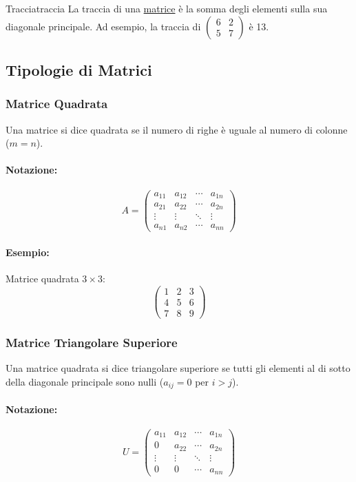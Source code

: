 \documentclass{article}
\begin{document}
\begin{definition}{Traccia}{traccia}
    La traccia di una \hyperlink{def:matrice}{matrice} è la somma degli elementi sulla sua diagonale principale. Ad esempio, la traccia di $\begin{pmatrix} 6 & 2 \\ 5 & 7 \end{pmatrix}$ è 13.
\end{definition}

\subsection{Tipologie di Matrici}

\subsubsection*{Matrice Quadrata}
Una matrice si dice quadrata se il numero di righe è uguale al numero di colonne ($m=n$).
\paragraph{Notazione:}
\[ A = \begin{pmatrix}
a_{11} & a_{12} & \cdots & a_{1n} \\
a_{21} & a_{22} & \cdots & a_{2n} \\
\vdots & \vdots & \ddots & \vdots \\
a_{n1} & a_{n2} & \cdots & a_{nn}
\end{pmatrix} \]
\paragraph{Esempio:} Matrice quadrata $3 \times 3$:
\[ \begin{pmatrix}
1 & 2 & 3 \\
4 & 5 & 6 \\
7 & 8 & 9
\end{pmatrix} \]

\subsubsection*{Matrice Triangolare Superiore}
Una matrice quadrata si dice triangolare superiore se tutti gli elementi al di sotto della diagonale principale sono nulli ($a_{ij} = 0$ per $i>j$).
\paragraph{Notazione:}
\[ U = \begin{pmatrix}
a_{11} & a_{12} & \cdots & a_{1n} \\
0 & a_{22} & \cdots & a_{2n} \\
\vdots & \vdots & \ddots & \vdots \\
0 & 0 & \cdots & a_{nn}
\end{pmatrix} \]
\end{document}
